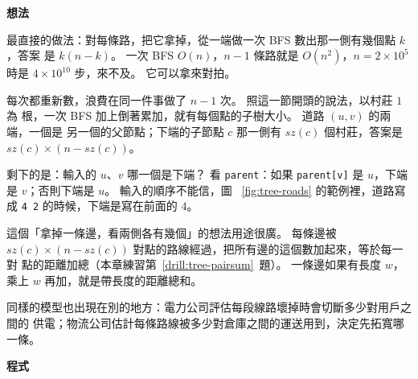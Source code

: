 \begin{center}
\label{fig:tree-roads}
\end{center}

\textbf{想法}

最直接的做法：對每條路，把它拿掉，從一端做一次 BFS 數出那一側有幾個點 $k$，答案
是 $k(n - k)$。 一次 BFS $O(n)$，$n - 1$ 條路就是 $O(n^2)$，$n = 2 \times 10^5$
時是 $4 \times 10^{10}$ 步，來不及。 它可以拿來對拍。

每次都重新數，浪費在同一件事做了 $n - 1$ 次。 照這一節開頭的說法，以村莊 $1$ 為
根，一次 BFS 加上倒著累加，就有每個點的子樹大小。 道路 $(u, v)$ 的兩端，一個是
另一個的父節點；下端的子節點 $c$ 那一側有 $\mathit{sz}(c)$ 個村莊，答案是
$\mathit{sz}(c) \times (n - \mathit{sz}(c))$。

剩下的是：輸入的 $u$、$v$ 哪一個是下端？ 看 \texttt{parent}：如果
\texttt{parent[v]} 是 $u$，下端是 $v$；否則下端是 $u$。 輸入的順序不能信，圖
~\ref{fig:tree-roads} 的範例裡，道路寫成 \texttt{4 2} 的時候，下端是寫在前面的
$4$。

這個「拿掉一條邊，看兩側各有幾個」的想法用途很廣。 每條邊被 $\mathit{sz}(c)
\times (n - \mathit{sz}(c))$ 對點的路線經過，把所有邊的這個數加起來，等於每一對
點的距離加總（本章練習第~\ref{drill:tree-pairsum}~題）。 一條邊如果有長度
$w$，乘上 $w$ 再加，就是帶長度的距離總和。

同樣的模型也出現在別的地方：電力公司評估每段線路壞掉時會切斷多少對用戶之間的
供電；物流公司估計每條路線被多少對倉庫之間的運送用到，決定先拓寬哪一條。

\textbf{程式}

